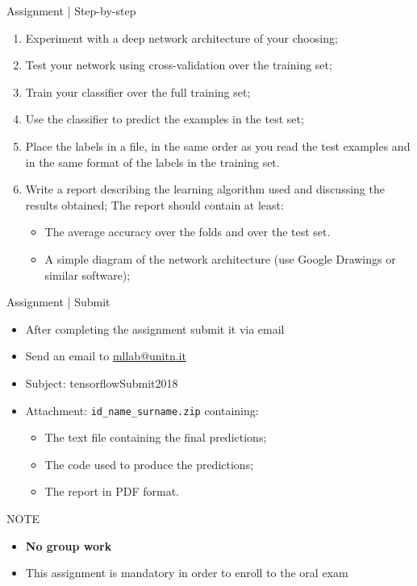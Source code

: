 \documentclass[10pt]{beamer}
\begin{document}
\begin{frame}{Assignment | Step-by-step}

\begin{enumerate}
\item Experiment with a deep network architecture of your choosing;
\item Test your network using cross-validation over the training set;
\item Train your classifier over the full training set;
\item Use the classifier to predict the examples in the test set;
\item Place the labels in a file, in the same order as you read the test
      examples and in the same format of the labels in the training set.
\item Write a report describing the learning algorithm used and discussing the
results obtained; The report should contain at least:
    \begin{itemize}
    \item The average accuracy over the folds and over the test set.
    \item A simple diagram of the network architecture (use Google Drawings or similar software);
    \end{itemize}
\end{enumerate}

\end{frame}


\begin{frame}{Assignment | Submit}

\begin{itemize}
    \item After completing the assignment submit it via email
    \item Send an email to \href{mailto:mllab@unitn.it}{mllab@unitn.it} 
    \item Subject: tensorflowSubmit2018
    \item Attachment: \texttt{id\_name\_surname.zip} containing:
    \begin{itemize}
        \item The text file containing the final predictions;
        \item The code used to produce the predictions;
        \item The report in PDF format.
    \end{itemize}
\end{itemize}
\begin{alertblock}{NOTE}
    \begin{itemize}
	\item \textbf{No group work}
        \item This assignment is mandatory in order to enroll to the oral exam
    \end{itemize}
\end{alertblock}

\end{frame}

\end{document}
